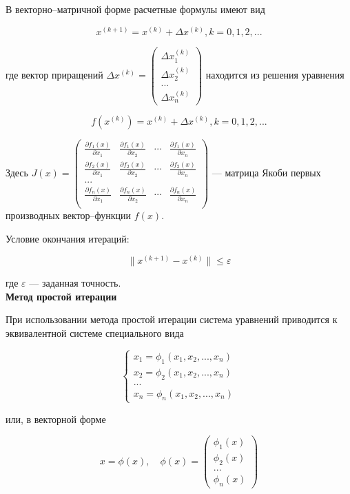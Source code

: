 В векторно--матричной форме расчетные формулы имеют вид

$$
x^{(k+1)}=x^{(k)}+ \Delta x^{(k)}, k=0,1,2,...
$$

где вектор приращений $\Delta x^{(k)}=\begin{pmatrix}
\Delta x_1^{(k)}\\
\Delta x_2^{(k)}\\
...\\
\Delta x_n^{(k)}
\end{pmatrix}$ находится из решения уравнения

$$
f(x^{(k)})=x^{(k)}+ \Delta x^{(k)}, k=0,1,2,...
$$

Здесь $J(x)=\begin{pmatrix}
\frac{\partial f_1(x)}{\partial x_1} & \frac{\partial f_1(x)}{\partial x_2} & \cdots & \frac{\partial f_1(x)}{\partial x_n}\\
\frac{\partial f_2(x)}{\partial x_1} & \frac{\partial f_2(x)}{\partial x_2} & \cdots & \frac{\partial f_2(x)}{\partial x_n}\\
...\\
\frac{\partial f_n(x)}{\partial x_1} & \frac{\partial f_n(x)}{\partial x_2} & \cdots & \frac{\partial f_n(x)}{\partial x_n}\\
\end{pmatrix}$ --- матрица Якоби первых производных вектор--функции $f(x)$.

\pagebreak

Условие окончания итераций:

$$
\|x^{(k+1)}-x^{(k)}\| \leq \varepsilon
$$

где $\varepsilon$ --- заданная точность.\\

\textbf{Метод простой итерации}

При использовании метода простой итерации система уравнений приводится к эквивалентной системе специального вида

$$
\begin{cases}
x_1=\phi_1(x_1, x_2, ..., x_n)\\
x_2=\phi_2(x_1, x_2, ..., x_n)\\
...\\
x_n=\phi_n(x_1, x_2, ..., x_n)
\end{cases}
$$

или, в векторной форме

$$
x=\phi(x), \quad \phi(x)=\begin{pmatrix}
\phi_1(x)\\
\phi_2(x)\\
...\\
\phi_n(x)
\end{pmatrix}
$$

